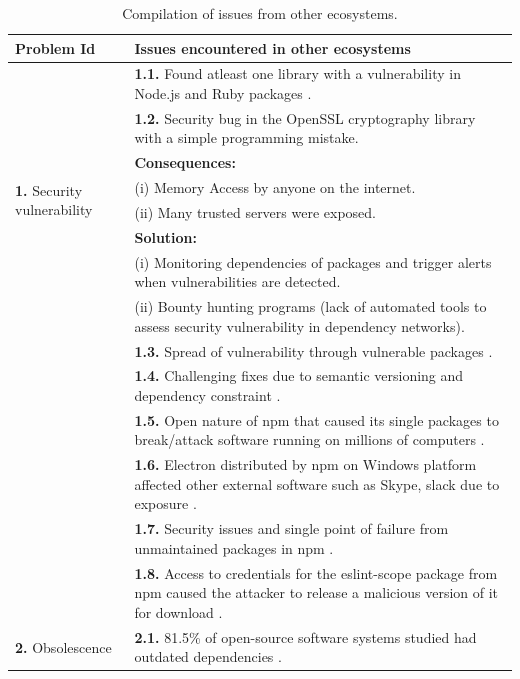 \documentclass[conference]{IEEEtran}
\begin{document}
\begin{table}[!t]
    \caption{Compilation of issues from other ecosystems.}
    \label{tab:compiled_issues}
    \begin{tabular}{|p{3cm}|p{14cm}|}
        \hline
        \textbf{Problem Id} & \textbf{Issues encountered in other ecosystems} \\
        \hline
        \multirow{8}{*}{\textbf{1.} Security vulnerability} &  \textbf{1.1.} Found atleast one library with a vulnerability in Node.js and Ruby packages \cite{decan2018impact}.\\
							&  \textbf{1.2.} Security bug in the OpenSSL cryptography library \cite{decan2018impact} with a simple programming mistake. \\							&  \textbf{Consequences:}\\
							&  (i) Memory Access by anyone on the internet.\\
							&  (ii) Many trusted servers were exposed. \\
							&  \textbf{Solution:}\\
							&  (i) Monitoring  dependencies of packages and trigger alerts when vulnerabilities are detected.\\
							&  (ii) Bounty hunting programs (lack of automated tools to assess security vulnerability in dependency networks).\\
							&  \textbf{1.3.} Spread of vulnerability  through vulnerable packages \cite{decan2018impact}.  \\
							&  \textbf{1.4.} Challenging fixes due to semantic versioning and dependency constraint \cite{decan2018impact}.\\
							&  \textbf{1.5.} Open nature of npm that caused its single packages to break/attack software running on millions of computers \cite{zimmermann2019small}.\\
							&  \textbf{1.6.} Electron distributed by npm on Windows platform affected other external software such as Skype,  slack due to exposure \cite{decan2018impact}. \\
							&  \textbf{1.7.} Security issues and single point of failure from unmaintained packages in npm \cite{zimmermann2019small}.\\
							&  \textbf{1.8.} Access to credentials for the eslint-scope package from npm  caused the attacker to release a malicious version of it for download \cite{zimmermann2019small}.  \\			
        \hline
        \multirow{7}{*}{\textbf{2.} Obsolescence} &\textbf{2.1.} 81.5\% of open-source software systems studied had outdated dependencies \cite{decan2018impact}.  \\

\end{tabular}
\end{table}
\end{document}
